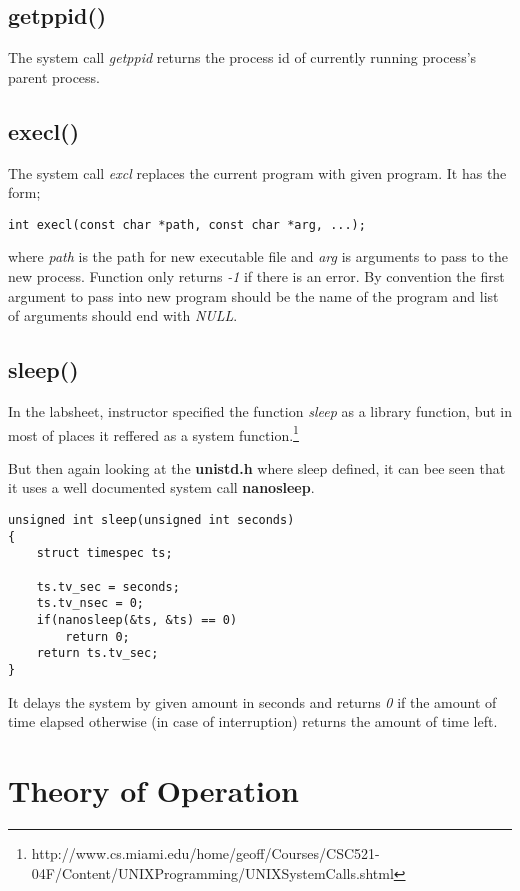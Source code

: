 \documentclass[11pt]{article}
\begin{document}
\subsection*{getppid()}
The system call \textit{getppid} returns the process id of currently running process's parent process.

\subsection*{execl()}
The system call \textit{excl} replaces the current program with given program. It has the form;

\begin{lstlisting}[frame=tlrb]
int execl(const char *path, const char *arg, ...);
\end{lstlisting}

where \textit{path} is the path for new executable file and \textit{arg} is arguments to pass to the new process. Function only returns \textit{-1} if there is an error. By convention the first argument to pass into new program should be the name of the program and list of arguments should end with \textit{NULL}.

\subsection*{sleep()}
In the labsheet, instructor specified the function \textit{sleep} as a library function, but in most of places it reffered as a system function.\footnote{http://www.cs.miami.edu/home/geoff/Courses/CSC521-04F/Content/UNIXProgramming/UNIXSystemCalls.shtml}

But then again looking at the \textbf{unistd.h} where sleep defined, it can bee seen that it uses a well documented system call \textbf{nanosleep}.

\begin{lstlisting}[frame=tlrb]
unsigned int sleep(unsigned int seconds)
{
	struct timespec ts;
	
	ts.tv_sec = seconds;
	ts.tv_nsec = 0;
	if(nanosleep(&ts, &ts) == 0)
		return 0;
	return ts.tv_sec;
}
\end{lstlisting}

It delays the system by given amount in seconds and returns \textit{0} if the amount of time elapsed otherwise (in case of interruption) returns the amount of time left.

\section*{Theory of Operation}
\end{document}
